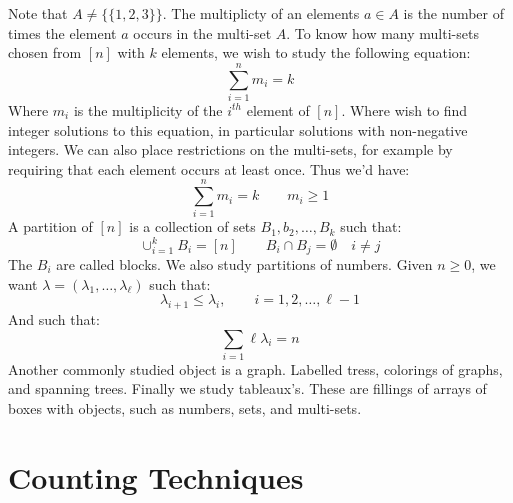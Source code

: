         Note that $A\ne\{\{1,2,3\}\}$. The multiplicty of
        an elements $a\in{A}$ is the number of times the
        element $a$ occurs in the multi-set $A$. To know how
        many multi-sets chosen from $[n]$ with $k$ elements,
        we wish to study the following equation:
        \begin{equation}
            \sum_{i=1}^{n}m_{i}=k
        \end{equation}
        Where $m_{i}$ is the multiplicity of the $i^{th}$
        element of $[n]$. Where wish to find integer solutions
        to this equation, in particular solutions with
        non-negative integers. We can also place restrictions
        on the multi-sets, for example by requiring that
        each element occurs at least once. Thus we'd have:
        \begin{equation}
            \sum_{i=1}^{n}m_{i}=k
            \quad\quad
            m_{i}\geq{1}
        \end{equation}
        A partition of $[n]$ is a collection of sets
        $B_{1},b_{2},\dots,B_{k}$ such that:
        \begin{equation}
            \cup_{i=1}^{k}B_{i}=[n]
            \quad\quad
            B_{i}\cap{B}_{j}=\emptyset
            \quad{i}\ne{j}
        \end{equation}
        The $B_{i}$ are called \textrm{blocks}. We also
        study partitions of numbers. Given $n\geq{0}$, we
        want $\lambda=(\lambda_{1},\dots,\lambda_{\ell})$ such
        that:
        \begin{equation}
            \lambda_{i+1}\leq\lambda_{i},
            \quad\quad
            i=1,2,\dots,\ell-1
        \end{equation}
        And such that:
        \begin{equation}
            \sum_{i=1}{\ell}\lambda_{i}=n
        \end{equation}
        Another commonly studied object is a graph. Labelled
        tress, colorings of graphs, and spanning trees. Finally
        we study tableaux's. These are fillings of arrays
        of boxes with objects, such as numbers, sets, and
        multi-sets.
    \section{Counting Techniques}
